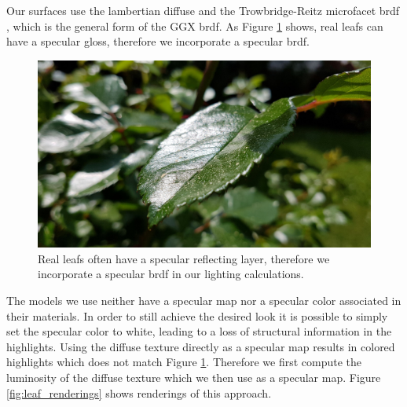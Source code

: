 Our surfaces use the lambertian diffuse \cite{lambert} and the Trowbridge-Reitz microfacet \ac{brdf} \cite{trowbridge_reitz}, which is the general form of the GGX \ac{brdf}.
As Figure \ref{fig:leaf_gloss} shows, real leafs can have a specular gloss, therefore we incorporate a specular \ac{brdf}.
\begin{figure}[ht]
    \centering
    \includegraphics[width=0.5\linewidth]{img/leaf_gloss.jpg}
    \caption[Leaf with glossy surface]{Real leafs often have a specular reflecting layer, therefore we incorporate a specular \ac{brdf} in our lighting calculations.}
    \label{fig:leaf_gloss}
\end{figure} 
The models we use neither have a specular map nor a specular color associated in their materials.
In order to still achieve the desired look it is possible to simply set the specular color to white, leading to a loss of structural information in the highlights.
Using the diffuse texture directly as a specular map results in colored highlights which does not match Figure \ref{fig:leaf_gloss}.
Therefore we first compute the luminosity of the diffuse texture which we then use as a specular map.
Figure \ref{fig:leaf_renderings} shows renderings of this approach.
